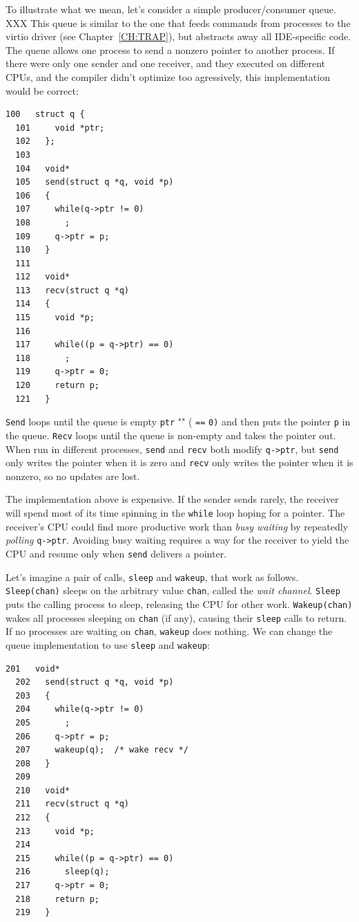 To illustrate what we mean, let's consider a
simple producer/consumer queue.
XXX This queue is similar to the one that feeds commands from processes
to the virtio driver
(see Chapter~\ref{CH:TRAP}), but abstracts away all
IDE-specific code.
The queue allows one process to send a nonzero pointer
to another process.
If there were only one sender and one receiver,
and they executed on different CPUs,
and the compiler didn't optimize too agressively,
this implementation would be correct:
\begin{lstlisting}[]
  100	struct q {
  101	  void *ptr;
  102	};
  103	
  104	void*
  105	send(struct q *q, void *p)
  106	{
  107	  while(q->ptr != 0)
  108	    ;
  109	  q->ptr = p;
  110	}
  111	
  112	void*
  113	recv(struct q *q)
  114	{
  115	  void *p;
  116	
  117	  while((p = q->ptr) == 0)
  118	    ;
  119	  q->ptr = 0;
  120	  return p;
  121	}
\end{lstlisting}
\lstinline{Send}
loops until the queue is empty
\lstinline{ptr} "" (
\lstinline{==}
\lstinline{0)}
and then puts the pointer
\lstinline{p}
in the queue.
\lstinline{Recv}
loops until the queue is non-empty
and takes the pointer out.
When run in different processes,
\lstinline{send}
and
\lstinline{recv}
both modify
\lstinline{q->ptr},
but
\lstinline{send}
only writes the pointer when it is zero
and
\lstinline{recv}
only writes the pointer when it is nonzero,
so no updates are lost.

The implementation above 
is expensive.  If the sender sends
rarely, the receiver will spend most
of its time spinning in the 
\lstinline{while}
loop hoping for a pointer.
The receiver's CPU could find more productive work than
\textit{busy waiting}
by repeatedly 
\textit{polling}
\lstinline{q->ptr}.
Avoiding busy waiting requires
a way for the receiver to yield the CPU
and resume only when 
\lstinline{send}
delivers a pointer.

Let's imagine a pair of calls, 
\lstinline{sleep}
and
\lstinline{wakeup},
that work as follows.
\lstinline{Sleep(chan)}
sleeps on the arbitrary value
\lstinline{chan},
called the 
\textit{wait channel}.
\lstinline{Sleep}
puts the calling process to sleep, releasing the CPU
for other work.
\lstinline{Wakeup(chan)}
wakes all processes sleeping on
\lstinline{chan}
(if any), causing their
\lstinline{sleep}
calls to return.
If no processes are waiting on
\lstinline{chan},
\lstinline{wakeup}
does nothing.
We can change the queue implementation to use
\lstinline{sleep}
and
\lstinline{wakeup}:
\begin{lstlisting}[]
  201	void*
  202	send(struct q *q, void *p)
  203	{
  204	  while(q->ptr != 0)
  205	    ;
  206	  q->ptr = p;
  207	  wakeup(q);  /* wake recv */
  208	}
  209	
  210	void*
  211	recv(struct q *q)
  212	{
  213	  void *p;
  214	
  215	  while((p = q->ptr) == 0)
  216	    sleep(q);
  217	  q->ptr = 0;
  218	  return p;
  219	}
\end{lstlisting}

